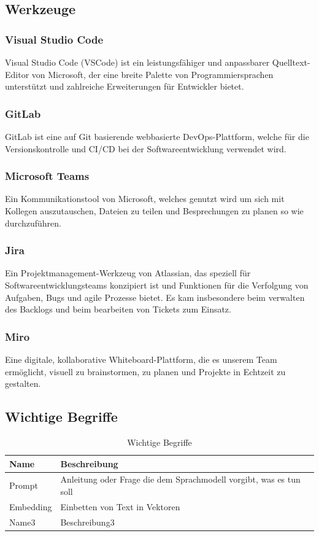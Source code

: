 \subsection{Werkzeuge}

\subsubsection{Visual Studio Code}
Visual Studio Code (VSCode) ist ein leistungsfähiger und anpassbarer Quelltext-Editor von Microsoft, der eine breite Palette von 
Programmiersprachen unterstützt und zahlreiche Erweiterungen für Entwickler bietet. 

\subsubsection{GitLab}
GitLab ist eine auf Git basierende webbasierte DevOps-Plattform, welche für die Versionskontrolle und CI/CD bei der Softwareentwicklung verwendet wird.

\subsubsection{Microsoft Teams}
Ein Kommunikationstool von Microsoft, welches genutzt wird um sich mit Kollegen auszutauschen, Dateien zu teilen und Besprechungen zu planen so wie durchzuführen.

\subsubsection{Jira}
Ein Projektmanagement-Werkzeug von Atlassian, das speziell für Softwareentwicklungsteams konzipiert ist und Funktionen für die Verfolgung von Aufgaben, Bugs und agile Prozesse bietet.
Es kam insbesondere beim verwalten des Backlogs und beim bearbeiten von Tickets zum Einsatz.

\subsubsection{Miro}
Eine digitale, kollaborative Whiteboard-Plattform, die es unserem Team ermöglicht, visuell zu brainstormen, zu planen und Projekte in Echtzeit zu gestalten.

\subsection{Wichtige Begriffe}

\begin{table}[H]
    \centering
    \caption{Wichtige Begriffe}
    \label{tab:technologien}
    \begin{tabular}{|l|l|}
    \hline
    \textbf{Name} & \textbf{Beschreibung} \\ \hline
    Prompt & Anleitung oder Frage die dem Sprachmodell vorgibt, was es tun soll \\ \hline
    Embedding & Einbetten von Text in Vektoren \\ \hline
    Name3 & Beschreibung3 \\ \hline
    \end{tabular}
\end{table}



